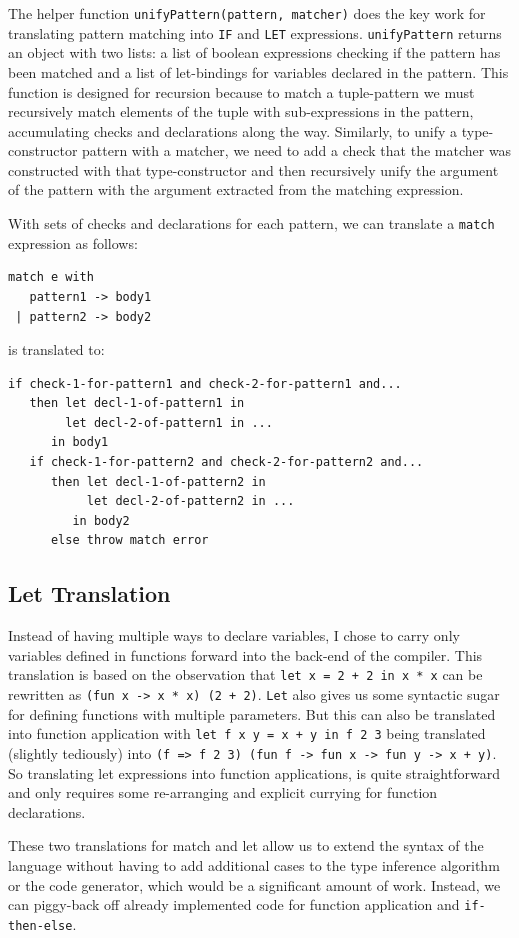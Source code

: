 \documentclass[12pt,a4paper,twoside,openright]{report}
\begin{document}
The helper function {\tt unifyPattern(pattern, matcher)} does the key work for translating pattern matching into {\tt IF} and {\tt LET} expressions.
{\tt unifyPattern} returns an object with two lists: a list of boolean expressions checking if the pattern has been matched and a list of let-bindings for variables declared in the pattern.
This function is designed for recursion because to match a tuple-pattern we must recursively match elements of the tuple with sub-expressions in the pattern, accumulating checks and declarations along the way.
Similarly, to unify a type-constructor pattern with a matcher, we need to add a check that the matcher was constructed with that type-constructor and then recursively unify the argument of the pattern with the argument extracted from the matching expression.

With sets of checks and declarations for each pattern, we can translate a {\tt match} expression as follows:
\begin{verbatim}
match e with
   pattern1 -> body1
 | pattern2 -> body2
\end{verbatim}
is translated to:
\begin{verbatim}
if check-1-for-pattern1 and check-2-for-pattern1 and...
   then let decl-1-of-pattern1 in
        let decl-2-of-pattern1 in ...
      in body1
   if check-1-for-pattern2 and check-2-for-pattern2 and...
      then let decl-1-of-pattern2 in
           let decl-2-of-pattern2 in ...
         in body2
      else throw match error
\end{verbatim}

\subsection{Let Translation}
Instead of having multiple ways to declare variables, I chose to carry only variables defined in functions forward into the back-end of the compiler.
This translation is based on the observation that {\tt let x = 2 + 2 in x * x} can be rewritten as {\tt (fun x -> x * x) (2 + 2)}.
{\tt Let} also gives us some syntactic sugar for defining functions with multiple parameters.
But this can also be translated into function application with {\tt let f x y = x + y in f 2 3} being translated (slightly tediously) into {\tt (f => f 2 3) (fun f -> fun x -> fun y -> x + y)}.
So translating let expressions into function applications, is quite straightforward and only requires some re-arranging and explicit currying for function declarations.

These two translations for match and let allow us to extend the syntax of the language without having to add additional cases to the type inference algorithm or the code generator, which would be a significant amount of work.
Instead, we can piggy-back off already implemented code for function application and {\tt if-then-else}.
\end{document}
